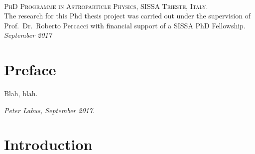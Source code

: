 \documentclass[11pt]{book} %
\makeatletter
\def\cleardoublepage{\clearpage%
  \if@twoside
  \ifodd\c@page\else
  \vspace*{\fill}
  \hfill
  \begin{center}
    This page intentionally left blank.
  \end{center}
  \vspace{\fill}
  \thispagestyle{empty}
  \newpage
  \if@twocolumn\hbox{}\newpage\fi
  \fi
  \fi
}
\makeatother
\begin{document}



\newpage
~\vfill
\thispagestyle{empty}

\noindent \textsc{PhD Programme in Astroparticle Physics, SISSA Trieste, Italy.}\\

\noindent The research for this Phd thesis project was carried out
under the supervision of Prof.~Dr.~Roberto Percacci with financial support
of a SISSA PhD Fellowship.\\

\noindent \textit{September 2017} %


\chapter*{Preface}

Blah, blah.

\begin{flushright}
  \textit{Peter Labus, September 2017.}
\end{flushright}


\pagestyle{empty} %

\tableofcontents %


\pagestyle{fancy} %


\chapter*{Introduction}
\end{document}
